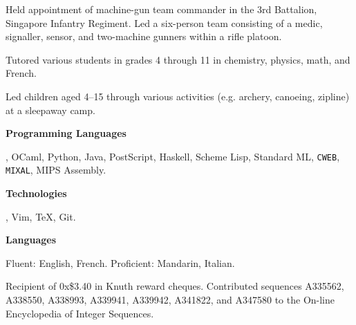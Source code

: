 \smallskip
Held appointment of machine-gun team commander in the 3rd Battalion, Singapore Infantry Regiment.
Led a six-person team consisting of a medic, signaller, sensor, and two-machine gunners within a rifle platoon.
\medbreak

\smallskip
Tutored various students in grades 4 through 11 in chemistry, physics, math, and French.
\medbreak

\smallskip
Led children aged 4--15 through various activities (e.g. archery, canoeing, zipline) at a sleepaway camp.
\medbreak


{\bf Programming Languages}\par
\CEE, OCaml, Python, Java, PostScript, Haskell, Scheme Lisp,  Standard ML, {\tt CWEB}, {\tt MIXAL}, MIPS Assembly.
\medbreak

{\bf Technologies}\par
\UNIX, Vim, \TeX, Git.
\medbreak

{\bf Languages}\par
Fluent: English, French. Proficient: Mandarin, Italian.
\medbreak


\parindent=10pt
\thing Recipient of 0x\$3.40 in Knuth reward cheques.
\smallskip
\thing Contributed sequences A335562, A338550, A338993, A339941, A339942, A341822, and A347580
to the On-line Encyclopedia of Integer Sequences.
\medbreak

\filbreak

\bye

